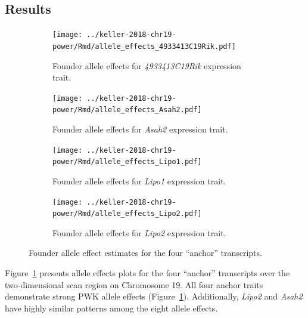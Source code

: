 \documentclass[oneside]{book}\usepackage[]{graphicx}\usepackage[]{color}
\begin{document}
\subsection{Results}

\begin{figure}
\centering
\begin{subfigure}[t]{0.45\textwidth}
\texttt{[image: ../keller-2018-chr19-power/Rmd/allele\_effects\_4933413C19Rik.pdf]}
\caption{Founder allele effects for \emph{4933413C19Rik} expression trait.}
\end{subfigure}
\begin{subfigure}[t]{0.45\textwidth}
\texttt{[image: ../keller-2018-chr19-power/Rmd/allele\_effects\_Asah2.pdf]}
\caption{Founder allele effects for \emph{Asah2} expression trait.}
\end{subfigure}
\begin{subfigure}[t]{0.45\textwidth}
\texttt{[image: ../keller-2018-chr19-power/Rmd/allele\_effects\_Lipo1.pdf]}
\caption{Founder allele effects for \emph{Lipo1} expression trait.}
\end{subfigure}
\begin{subfigure}[t]{0.45\textwidth}
\texttt{[image: ../keller-2018-chr19-power/Rmd/allele\_effects\_Lipo2.pdf]}
\caption{Founder allele effects for \emph{Lipo2} expression trait.}
\end{subfigure}
\caption{Founder allele effect estimates for the four ``anchor'' transcripts.}\label{fig:anchor-effects}
\end{figure}


Figure~\ref{fig:anchor-effects} presents allele effects plots for the four ``anchor'' transcripts over the two-dimensional scan region on Chromosome 19. 
All four anchor traits demonstrate strong PWK allele effects (Figure~\ref{fig:anchor-effects}). 
Additionally, \emph{Lipo2} and \emph{Asah2} have highly similar patterns among the eight allele effects.


\end{document}
